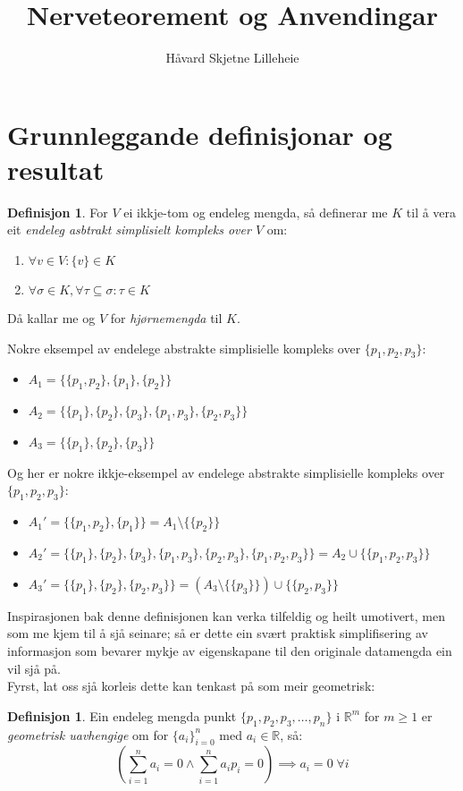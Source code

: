 \documentclass[a4paper, titlepage, 12pt, norsk]{article}
\title{Nerveteorement og Anvendingar}
\author{Håvard Skjetne Lilleheie}
\theoremstyle{plain}
\theoremstyle{definition}
\newtheorem{definition}[theorem]{Definisjon}
\newcommand{\Rb}{\mathbb{R}}
\begin{document}
\maketitle

\section{Grunnleggande definisjonar og resultat}

\begin{definition}
	For $V$ ei ikkje-tom og endeleg mengda, så definerar me $K$ til å vera eit \emph{endeleg asbtrakt simplisielt kompleks over $V$} om:
	\begin{enumerate}
		\item{$\forall v \in V: \{v\} \in K$}
		\item{$\forall \sigma \in K, \forall \tau \subseteq \sigma: \tau \in K$}
	\end{enumerate}
	Då kallar me og $V$ for \emph{hjørnemengda} til $K$.
\end{definition}
Nokre eksempel av endelege abstrakte simplisielle kompleks over $\{p_1, p_2, p_3\}$:
\begin{itemize}
	\item{$A_1=\{\{p_1, p_2\}, \{p_1\}, \{p_2\}\}$}
	\item{$A_2=\{\{p_1\}, \{p_2\}, \{p_3\}, \{p_1, p_3\}, \{p_2, p_3\}\}$}
	\item{$A_3=\{\{p_1\}, \{p_2\}, \{p_3\}\}$}
\end{itemize}
Og her er nokre ikkje-eksempel av endelege abstrakte simplisielle kompleks over $\{p_1, p_2, p_3\}$:
\begin{itemize}
	\item{$A_1'=\{\{p_1, p_2\}, \{p_1\}\}=A_1 \setminus \{\{p_2\}\}$}
	\item{$A_2'=\{\{p_1\}, \{p_2\}, \{p_3\}, \{p_1, p_3\}, \{p_2, p_3\}, \{p_1, p_2, p_3\}\}=A_2 \cup \{\{p_1, p_2, p_3\}\}$}
	\item{$A_3'=\{\{p_1\}, \{p_2\}, \{p_2, p_3\}\}=\left(A_3 \setminus \{\{p_3\}\}\right) \cup \{\{p_2, p_3\}\}$}
\end{itemize}
Inspirasjonen bak denne definisjonen kan verka tilfeldig og heilt umotivert, men som me kjem til å sjå seinare; så er dette ein svært praktisk simplifisering av informasjon som bevarer mykje av eigenskapane til den originale datamengda ein vil sjå på. 
\\Fyrst, lat oss sjå korleis dette kan tenkast på som meir geometrisk:
\begin{definition}
	Ein endeleg mengda punkt $\{p_1, p_2, p_3, \dots, p_n\}$ i $\Rb^m$ for $m\geq1$ er \emph{geometrisk uavhengige} om for $\{a_i\}_{i=0}^n$ med $a_i\in\Rb$, så:
	\begin{equation*}
		\left(\sum_{i=1}^n a_i=0 \land  \sum_{i=1}^n a_ip_i=0\right)\implies a_i=0 \; \forall i
	\end{equation*}
\end{definition}
\end{document}
